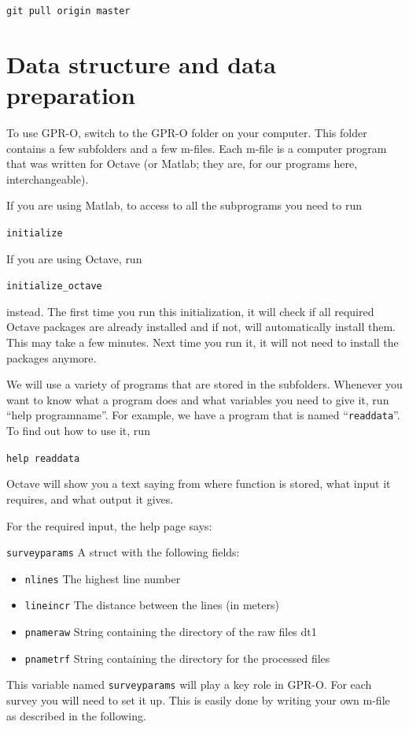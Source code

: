 \documentclass[11pt]{article}
\begin{document}
\qquad \verb#git pull origin master#


\section{Data structure and data preparation}

To use GPR-O, switch to the GPR-O folder on your computer. This folder
contains a few subfolders and a few m-files. Each m-file is a computer
program that was written for Octave (or Matlab; they are, for our
programs here, interchangeable).

If you are using Matlab, to access to all the subprograms you need to run

\qquad \verb#initialize#

If you are using Octave, run

\qquad \verb#initialize_octave#

instead. The first time you run this initialization, it will check if
all required Octave packages are already installed and if not, will
automatically install them. This may take a few minutes. Next time you
run it, it will not need to install the packages anymore.

We will use a variety of programs that are stored in the
subfolders. Whenever you want to know what a program does and what
variables you need to give it, run ``help programname''. For example,
we have a program that is named ``\verb#readdata#''. To find out how to use
it, run

\qquad \verb#help readdata#

Octave will show you a text saying from where function is stored, what
input it requires, and what output it gives.

For the required input, the help page says:

\verb#surveyparams# A struct with the following fields:
\begin{itemize}
\item \verb#nlines# The highest line number
\item \verb"lineincr" The distance between the lines (in meters)
\item \verb#pnameraw# String containing the directory of the raw files dt1
\item \verb#pnametrf# String containing the directory for the processed files
\end{itemize}
 
This variable named \verb#surveyparams# will play a key role in
GPR-O. For each survey you will need to set it up. This is easily
done by writing your own m-file as described in the following.
\end{document}
